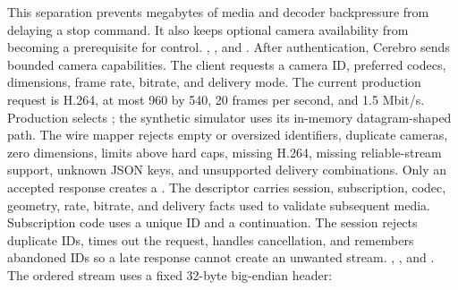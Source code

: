 {}This separation prevents megabytes of media and decoder backpressure from delaying a stop command. It also keeps optional camera availability from becoming a prerequisite for control.\markdownRendererInterblockSeparator
{}
\markdownRendererSectionEnd \markdownRendererSectionBegin
{}\markdownRendererInterblockSeparator
{}\markdownRendererBlockQuoteBegin
{} , , and .\markdownRendererBlockQuoteEnd \markdownRendererInterblockSeparator
{}After authentication, Cerebro sends bounded camera capabilities. The client requests a camera ID, preferred codecs, dimensions, frame rate, bitrate, and delivery mode. The current production request is H.264, at most 960 by 540, 20 frames per second, and 1.5 Mbit/s. Production selects ; the synthetic simulator uses its in-memory datagram-shaped path.\markdownRendererParagraphSeparator
{}The wire mapper rejects empty or oversized identifiers, duplicate cameras, zero dimensions, limits above hard caps, missing H.264, missing reliable-stream support, unknown JSON keys, and unsupported delivery combinations.\markdownRendererParagraphSeparator
{}Only an accepted response creates a . The descriptor carries session, subscription, codec, geometry, rate, bitrate, and delivery facts used to validate subsequent media.\markdownRendererParagraphSeparator
{}Subscription code uses a unique ID and a continuation. The session rejects duplicate IDs, times out the request, handles cancellation, and remembers abandoned IDs so a late response cannot create an unwanted stream.\markdownRendererInterblockSeparator
{}
\markdownRendererSectionEnd \markdownRendererSectionBegin
{}\markdownRendererInterblockSeparator
{}\markdownRendererBlockQuoteBegin
{} , , and .\markdownRendererBlockQuoteEnd \markdownRendererInterblockSeparator
{}The ordered stream uses a fixed 32-byte big-endian  header:\markdownRendererInterblockSeparator
{}\markdownRendererInterblockSeparator
